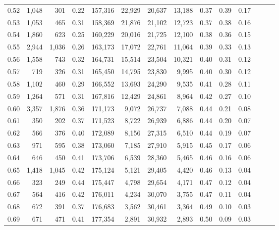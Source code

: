 \begin{tabular}{rrrrrrrrrrrrrr}
0.52 &   1,048 &    301 &  0.22 &  157,316 &   22,929 &  20,637 &  13,188 &  0.37 &  0.39 &      0.17 \\
0.53 &   1,053 &    465 &  0.31 &  158,369 &   21,876 &  21,102 &  12,723 &  0.37 &  0.38 &      0.16 \\
0.54 &   1,860 &    623 &  0.25 &  160,229 &   20,016 &  21,725 &  12,100 &  0.38 &  0.36 &      0.15 \\
0.55 &   2,944 &  1,036 &  0.26 &  163,173 &   17,072 &  22,761 &  11,064 &  0.39 &  0.33 &      0.13 \\
0.56 &   1,558 &    743 &  0.32 &  164,731 &   15,514 &  23,504 &  10,321 &  0.40 &  0.31 &      0.12 \\
0.57 &     719 &    326 &  0.31 &  165,450 &   14,795 &  23,830 &   9,995 &  0.40 &  0.30 &      0.12 \\
0.58 &   1,102 &    460 &  0.29 &  166,552 &   13,693 &  24,290 &   9,535 &  0.41 &  0.28 &      0.11 \\
0.59 &   1,264 &    571 &  0.31 &  167,816 &   12,429 &  24,861 &   8,964 &  0.42 &  0.27 &      0.10 \\
0.60 &   3,357 &  1,876 &  0.36 &  171,173 &    9,072 &  26,737 &   7,088 &  0.44 &  0.21 &      0.08 \\
0.61 &     350 &    202 &  0.37 &  171,523 &    8,722 &  26,939 &   6,886 &  0.44 &  0.20 &      0.07 \\
0.62 &     566 &    376 &  0.40 &  172,089 &    8,156 &  27,315 &   6,510 &  0.44 &  0.19 &      0.07 \\
0.63 &     971 &    595 &  0.38 &  173,060 &    7,185 &  27,910 &   5,915 &  0.45 &  0.17 &      0.06 \\
0.64 &     646 &    450 &  0.41 &  173,706 &    6,539 &  28,360 &   5,465 &  0.46 &  0.16 &      0.06 \\
0.65 &   1,418 &  1,045 &  0.42 &  175,124 &    5,121 &  29,405 &   4,420 &  0.46 &  0.13 &      0.04 \\
0.66 &     323 &    249 &  0.44 &  175,447 &    4,798 &  29,654 &   4,171 &  0.47 &  0.12 &      0.04 \\
0.67 &     564 &    416 &  0.42 &  176,011 &    4,234 &  30,070 &   3,755 &  0.47 &  0.11 &      0.04 \\
0.68 &     672 &    391 &  0.37 &  176,683 &    3,562 &  30,461 &   3,364 &  0.49 &  0.10 &      0.03 \\
0.69 &     671 &    471 &  0.41 &  177,354 &    2,891 &  30,932 &   2,893 &  0.50 &  0.09 &      0.03 \\

\end{tabular}
